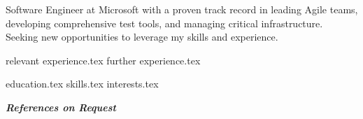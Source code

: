 \documentclass[letterpaper,11pt]{article}
\begin{document}
\thispagestyle{empty}

\vspace{0.8cm} 

Software Engineer at Microsoft with a proven track record in leading Agile teams, developing comprehensive test tools, and managing critical infrastructure. Seeking new opportunities to leverage my skills and experience.


{relevant experience.tex}
{further experience.tex}


\newpage
{education.tex}
{skills.tex}
{interests.tex}
\thispagestyle{empty}

\centering
\textit{\textbf{References on Request}}
\end{document}
